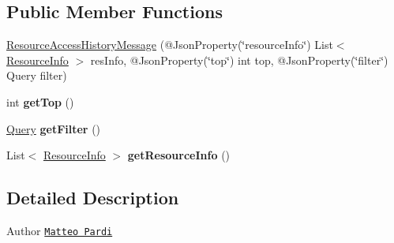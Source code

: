 \subsection*{Public Member Functions}
\begin{DoxyCompactItemize}
\item 
\hyperlink{classeu_1_1h2020_1_1symbiote_1_1enabler_1_1messaging_1_1model_1_1rap_1_1access_1_1ResourceAccessHistoryMessage_a38b3bd8932837b52274cefa2b549b51b}{Resource\+Access\+History\+Message} (@Json\+Property(\char`\"{}resource\+Info\char`\"{}) List$<$ \hyperlink{classeu_1_1h2020_1_1symbiote_1_1enabler_1_1messaging_1_1model_1_1rap_1_1db_1_1ResourceInfo}{Resource\+Info} $>$ res\+Info, @Json\+Property(\char`\"{}top\char`\"{}) int top, @Json\+Property(\char`\"{}filter\char`\"{}) Query filter)
\item 
\mbox{\label{classeu_1_1h2020_1_1symbiote_1_1enabler_1_1messaging_1_1model_1_1rap_1_1access_1_1ResourceAccessHistoryMessage_acd84341a1734c098f50288dfb013fcb2}} 
int {\bfseries get\+Top} ()
\item 
\mbox{\label{classeu_1_1h2020_1_1symbiote_1_1enabler_1_1messaging_1_1model_1_1rap_1_1access_1_1ResourceAccessHistoryMessage_aa0786e30d2393fe06c350ce2bc430ec6}} 
\hyperlink{classeu_1_1h2020_1_1symbiote_1_1enabler_1_1messaging_1_1model_1_1rap_1_1query_1_1Query}{Query} {\bfseries get\+Filter} ()
\item 
\mbox{\label{classeu_1_1h2020_1_1symbiote_1_1enabler_1_1messaging_1_1model_1_1rap_1_1access_1_1ResourceAccessHistoryMessage_aeee10b8fae06733ce1d6284bcb15eeef}} 
List$<$ \hyperlink{classeu_1_1h2020_1_1symbiote_1_1enabler_1_1messaging_1_1model_1_1rap_1_1db_1_1ResourceInfo}{Resource\+Info} $>$ {\bfseries get\+Resource\+Info} ()
\end{DoxyCompactItemize}


\subsection{Detailed Description}
\begin{DoxyAuthor}{Author}
\href{mailto:m.pardi@nextworks.it}{\tt Matteo Pardi} 
\end{DoxyAuthor}


